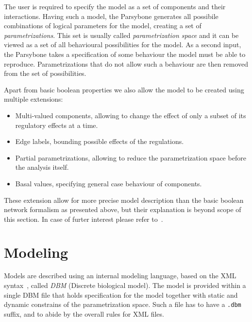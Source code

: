 \documentclass[12pt]{article}
\begin{document}
The user is required to specify the model as a set of components and their interactions. Having such a model, the Parsybone generates all possibile combinations of logical parameters for the model, creating a set of \emph{parametrizations}. This set is usually called \emph{parametrization space} and it can be viewed as a set of all behavioural possibilities for the model. As a second input, the Parsybone takes a specification of some behaviour the model must be able to reproduce. Parametrizations that do not allow such a behaviour are then removed from the set of possibilities.

Apart from basic boolean properties we also allow the model to be created using multiple extensions:
\begin{itemize}
\item Multi-valued components, allowing to change the effect of only a subset of its regulatory effects at a time.
\item Edge labels, bounding possible effects of the regulations.
\item Partial parametrizations, allowing to reduce the parametrization space before the analysis itself.
\item Basal values, specifying general case behaviour of components.
\end{itemize}

These extension allow for more precise model description than the basic boolean network formalism as presented above, but their explanation is beyond scope of this section. In case of furter interest please refer to~\cite{TechReport}.

\section{Modeling}
\label{sec:modeling}
 Models are described using an internal modeling language, based on the XML syntax~\cite{XML}, called \emph{DBM} (Discrete biological model). The model is provided within a single DBM file that holds specification for the model together with static and dynamic constrains of the parametrization space. Such a file has to have a \texttt{.dbm} suffix, and to abide by the overall rules for XML files.
\end{document}
